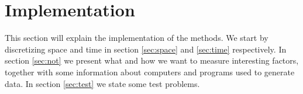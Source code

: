 \chapter{Implementation}%
\label{sec:imp}
This section will explain the implementation of the methods. We start by discretizing space and time in section \ref{sec:space} and \ref{sec:time} respectively.
In section \ref{sec:not} we present what and how we want to measure interesting factors, together with some information about computers and programs used to generate data.
In section \ref{sec:test} we state some test problems.

